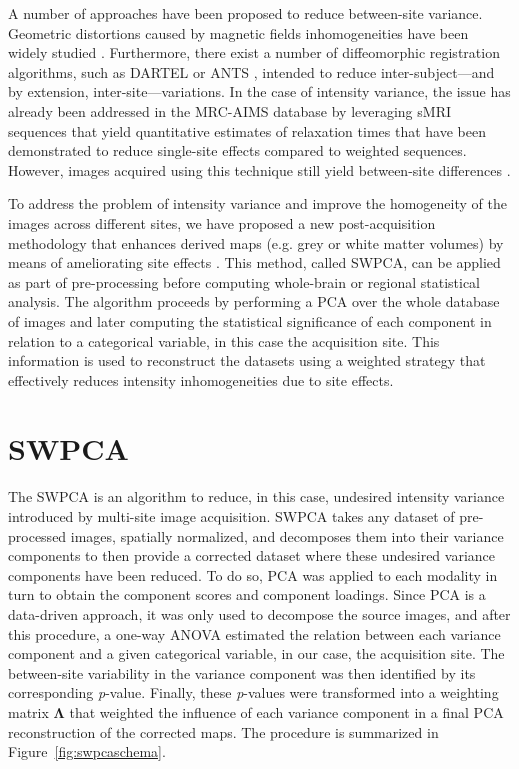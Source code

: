 A number of approaches have been proposed to reduce between-site variance. Geometric distortions caused by magnetic fields inhomogeneities have been widely studied \cite{Jovicich2006,Stonnington2008}. Furthermore, there exist a number of diffeomorphic registration algorithms, such as DARTEL \cite{Ashburner2007} or ANTS \cite{Avants2010}, intended to reduce inter-subject—and by extension, inter-site—variations. In the case of intensity variance, the issue has already been addressed in the \ac{MRC-AIMS} database by leveraging sMRI sequences that yield quantitative estimates of relaxation times \cite{deoni2008standardized} that have been demonstrated to reduce single-site effects compared to weighted sequences. However, images acquired using this technique still yield between-site differences \cite{Suckling2014}.

To address the problem of intensity variance and improve the homogeneity of the images across different sites, we have proposed a new post-acquisition methodology that enhances derived maps (e.g. grey or white matter volumes) by means of ameliorating site effects \cite{Martinez-Murcia2016a}. This method, called \acf{SWPCA}, can be applied as part of pre-processing before computing whole-brain or regional statistical analysis. The algorithm proceeds by performing a \ac{PCA} over the whole database of images and later computing the statistical significance of each component in relation to a categorical variable, in this case the acquisition site. This information is used to reconstruct the datasets using a weighted strategy that effectively reduces intensity inhomogeneities due to site effects.

\section{\acf{SWPCA}}
The \acf{SWPCA} is an algorithm to reduce, in this case, undesired intensity variance introduced by multi-site image acquisition. \ac{SWPCA} takes any dataset of pre-processed images, spatially normalized, and decomposes them into their variance components to then provide a corrected dataset where these undesired variance components have been reduced. To do so, \ac{PCA} was applied to each modality in turn to obtain the component scores and component loadings. Since \ac{PCA} is a data-driven approach, it was only used to decompose the source images, and after this procedure, a one-way \ac{ANOVA} estimated the relation between each variance component and a given categorical variable, in our case, the acquisition site. The between-site variability in the variance component was then identified by its corresponding \textit{p}-value. Finally, these \textit{p}-values were transformed into a weighting matrix  $\boldsymbol\Lambda$ that weighted the influence of each variance component in a final \ac{PCA} reconstruction of the corrected maps. The procedure is summarized in Figure~\ref{fig:swpcaschema}. 

